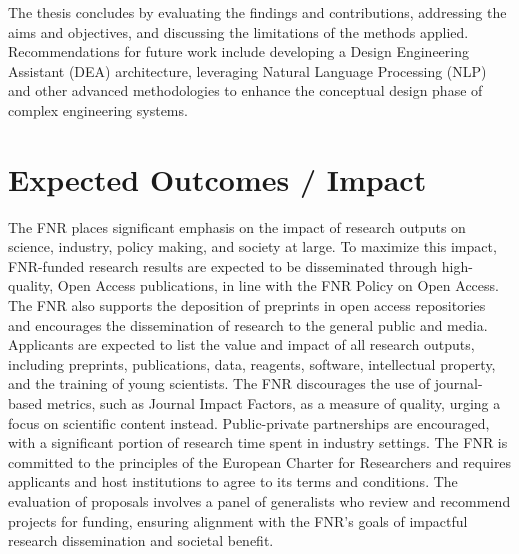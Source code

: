 \documentclass{article}
\begin{document}
The thesis concludes by evaluating the findings and contributions, addressing the aims and objectives, and discussing the limitations of the methods applied. Recommendations for future work include developing a Design Engineering Assistant (DEA) architecture, leveraging Natural Language Processing (NLP) and other advanced methodologies to enhance the conceptual design phase of complex engineering systems.

\section{Expected Outcomes / Impact}

The FNR places significant emphasis on the impact of research outputs on science, industry, policy making, and society at large. To maximize this impact, FNR-funded research results are expected to be disseminated through high-quality, Open Access publications, in line with the FNR Policy on Open Access. The FNR also supports the deposition of preprints in open access repositories and encourages the dissemination of research to the general public and media. Applicants are expected to list the value and impact of all research outputs, including preprints, publications, data, reagents, software, intellectual property, and the training of young scientists. The FNR discourages the use of journal-based metrics, such as Journal Impact Factors, as a measure of quality, urging a focus on scientific content instead. Public-private partnerships are encouraged, with a significant portion of research time spent in industry settings. The FNR is committed to the principles of the European Charter for Researchers and requires applicants and host institutions to agree to its terms and conditions. The evaluation of proposals involves a panel of generalists who review and recommend projects for funding, ensuring alignment with the FNR's goals of impactful research dissemination and societal benefit.
\end{document}
